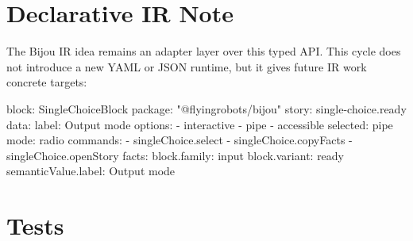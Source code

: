 \section{Declarative IR Note}\label{record-096-declarative-ir-note}

The Bijou IR idea remains an adapter layer over this typed API. This cycle does not introduce a new YAML or JSON runtime, but it gives future IR work concrete targets:

\begin{CodeBlock}
block: SingleChoiceBlock
package: "@flyingrobots/bijou"
story: single-choice.ready
data:
  label: Output mode
  options:
    - interactive
    - pipe
    - accessible
  selected: pipe
  mode: radio
commands:
  - singleChoice.select
  - singleChoice.copyFacts
  - singleChoice.openStory
facts:
  block.family: input
  block.variant: ready
  semanticValue.label: Output mode
\end{CodeBlock}

\section{Tests}\label{record-096-tests}

